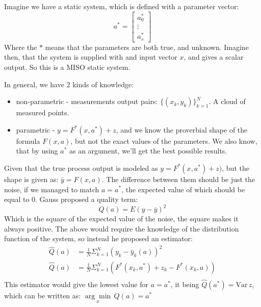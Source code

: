 {
    
Imagine we have a static system, which is defined with a parameter vector:
\begin{equation}
    a^{*}= \begin{bmatrix}
        a_0^{*} \\
        \vdots\\
        a_s^{*}
    \end{bmatrix}
\end{equation}
Where the $*$ means that the parameters are both true, and unknown.
Imagine then, that the system is supplied with and input vector $x$, and gives a scalar output. So this is a MISO static system.


{
    In general, we have 2 kinds of knowledge:
    \begin{itemize}
        \item non-parametric - measurements output pairs: $\{(x_k,y_k)\}_{k=1}^{N}$. A cloud of measured points.
        \item parametric - $y = F^{*}(x,a^{*})+z$, and we know the proverbial shape of the formula $F(x,a)$, but not the exact values of the parameters. We also know, that by using $a^{*}$ as an argument, we'll get the best possible results.
    \end{itemize}
}

{
    Given that the true process output is modeled as $y = F^{*}(x,a^{*})+z)$, but the shape is given as: $\bar{y} = F(x,a)$. The difference between them should be just the noise, if we managed to match $a = a^{*}$, the expected value of which should be equal to 0.  Gauss proposed a quality term:
  \begin{equation}
      Q(a) = E(y-\bar{y})^{2}
 \end{equation}
 Which is the square of the expected value of the noise, the square makes it always positive.
 The above would require the knowledge of the distribution function of the system, so instead he proposed an estimator:
 \begin{equation}
     \begin{aligned}
         \hat{Q}(a) &= \frac{1}{N} \Sigma_{k=1}^{N}(y_k-\bar{y}_k(a))^{2}\\[1.25ex]
         \hat{Q}(a) &= \frac{1}{N}\Sigma_{k=1}^{N}(F^{*}(x_k,a^{*})+z_k - F^{*}(x_k,a))\\[1.25ex]
     \end{aligned}
 \end{equation}
 This estimator would give the lowest value for $a = a^{*}$, it being $\hat{Q}(a^{*}) = \text{Var}\,z$, which can be written as: $\underset{x}{\arg\min}\,Q(a) = a^{*}$ 

}}
